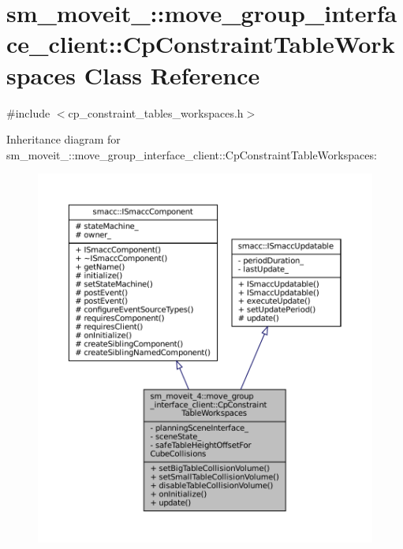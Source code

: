 \hypertarget{classsm__moveit__4_1_1move__group__interface__client_1_1CpConstraintTableWorkspaces}{}\section{sm\+\_\+moveit\+\_\+:\+:move\+\_\+group\+\_\+interface\+\_\+client\+:\+:Cp\+Constraint\+Table\+Workspaces Class Reference}
\label{classsm__moveit__4_1_1move__group__interface__client_1_1CpConstraintTableWorkspaces}


{\ttfamily \#include $<$cp\+\_\+constraint\+\_\+tables\+\_\+workspaces.\+h$>$}



Inheritance diagram for sm\+\_\+moveit\+\_\+:\+:move\+\_\+group\+\_\+interface\+\_\+client\+:\+:Cp\+Constraint\+Table\+Workspaces\+:
\nopagebreak
\begin{figure}[H]
\begin{center}
\leavevmode
\includegraphics[width=350pt]{classsm__moveit__4_1_1move__group__interface__client_1_1CpConstraintTableWorkspaces__inherit__graph}
\end{center}
\end{figure}


